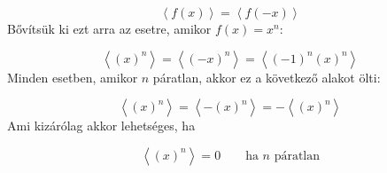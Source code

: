 \begin{equation}
    \left< f \left( x \right) \right>
    =
    \left< f \left( -x \right) \right>
\end{equation}
Bővítsük ki ezt arra az esetre, amikor $f \left( x \right) = x^{n}$:

\begin{equation}
    \left< \left( x \right)^{n} \right>
    =
    \left< \left( -x \right)^{n} \right>
    =
    \left< \left( -1 \right)^{n} \left( x \right)^{n} \right>
\end{equation}
Minden esetben, amikor $n$ páratlan, akkor ez a következő alakot ölti:

\begin{equation}
    \left< \left( x \right)^{n} \right>
    =
    \left< - \left( x \right)^{n} \right>
    =
    -\left< \left( x \right)^{n} \right>
\end{equation}
Ami kizárólag akkor lehetséges, ha

\begin{equation}
    \boxed{\left< \left( x \right)^{n} \right>
    =
    0}
    \quad \quad
    \text{ha $n$ páratlan}
\end{equation}